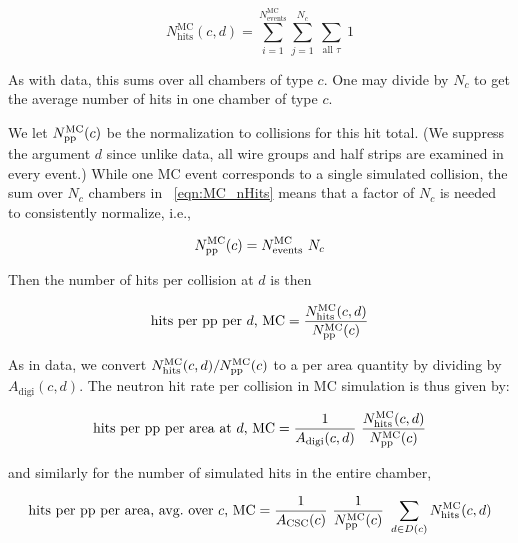 \begin{equation}
	\label{eqn:MC_nHits}
	N_\text{hits}^\text{MC}(c, d) = 
        \sum_{i=1}^{N^\text{MC}_\text{events}}
        \sum_{j=1}^{N_c} \ 
        \sum_{\text{all~}\tau}
        \ 1
\end{equation}

As with data, this sums over all chambers of type $c$.  One may divide
by $N_c$ to get the average number of hits in one chamber of type $c$.

We let $N_\text{\ensuremath{\mathrm{p}}\ensuremath{\mathrm{p}}}^\text{MC}(c)$ be the normalization to \pp
collisions for this hit total. (We suppress the argument $d$ since
unlike data, all wire groups and half strips are examined in every
event.)  While one MC event corresponds to a single simulated \pp
collision, the sum over $N_c$ chambers in \Eq~\ref{eqn:MC_nHits} means
that a factor of $N_c$ is needed to consistently normalize, i.e.,

\begin{equation}
    N_\text{\ensuremath{\mathrm{p}}\ensuremath{\mathrm{p}}}^\text{MC}(c) = N_\text{events}^\text{MC}  \  N_c
\end{equation}

Then the number of hits per \pp collision at $d$ is then

\begin{equation}
    \label{eqn:MC_hits_perPP_perDigi}
 \text{hits per \pp per $d$, MC} = 
    \frac{N_\text{hits}^\text{MC}(c,d)}{N_\text{\pp}^\text{MC}(c)}
\end{equation}

As in data, we convert $N_\text{hits}^\text{MC}(c, d)/N_\text{\ensuremath{\mathrm{p}}\ensuremath{\mathrm{p}}}^\text{MC}(c)$ to a per area quantity by dividing by $A_\text{digi}(c, d)$. The neutron hit rate per \pp collision in MC simulation is thus given by:

\begin{equation}
	\label{eqn:MC_hits_perA_perPP_perDigi}
\text{hits per \pp per area at $d$, MC} = 
	\frac{1}{A_\text{digi}(c, d)}  \  \frac{N_\text{hits}^\text{MC}(c, d)}{N_\text{\pp}^\text{MC}(c)}
\end{equation}

and similarly for the number of simulated hits in the entire chamber,

\begin{equation}
	\label{eqn:MC_hits_perA_perPP_perCSC}
\text{hits per \pp per area, avg.\ over $c$, MC} = 
	\frac{1}{A_\text{CSC}(c)}  \  \frac{1}{N_\text{\pp}^\text{MC}(c)}  \  \sum_{d\in D(c)}{N_\text{hits}^\text{MC}(c, d)}
\end{equation}

